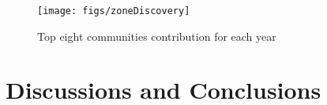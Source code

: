 \documentclass{article}
\begin{document}

\begin{figure} [h]
  \centering
  \texttt{[image: figs/zoneDiscovery]}
  \caption{Top eight communities contribution for each year}
  \label{fig:zoneDiscovery}
\end{figure}



\section{Discussions and Conclusions} \label{sec:discuCons}








\end{document}
